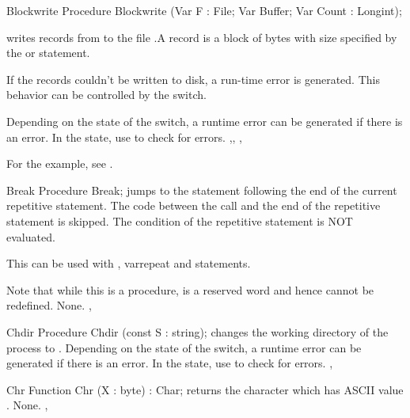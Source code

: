
\begin{procedure}{Blockwrite}
\Declaration
Procedure Blockwrite (Var F : File; Var Buffer; Var Count : Longint);

\Description
{} writes  records from  to the file
 .A record is a block of bytes with size specified by the  or
 statement.

If the records couldn't be written to disk, a run-time error is generated.
This behavior can be controlled by the  switch.

\Errors
Depending on the state of the  switch, a runtime error can be 
generated if there is an error. In the  state, use 
to check for errors.
\SeeAlso
{},, , 
\end{procedure}

For the example, see .

\begin{procedure}{Break}
\Declaration
Procedure Break;
\Description
{} jumps to the statement following the end of the current
repetitive statement. The code between the  call and
the end of the repetitive statement is skipped.
The condition of the repetitive statement is NOT evaluated.

This can be used with , var{repeat} and  statements.

Note that while this is a procedure,  is a reserved word
and hence cannot be redefined.
\Errors
None.
\SeeAlso
{}, 
\end{procedure}


\begin{procedure}{Chdir}
\Declaration
Procedure Chdir (const S : string);
\Description
{} changes the working directory of the process to .
\Errors
\Errors
Depending on the state of the  switch, a runtime error can be 
generated if there is an error. In the  state, use 
to check for errors.
\SeeAlso
{}, 
\end{procedure}


\begin{function}{Chr}
\Declaration
Function Chr (X : byte) : Char;
\Description
{} returns the character which has ASCII value .
\Errors
None.
\SeeAlso
{}, 
\end{function}

